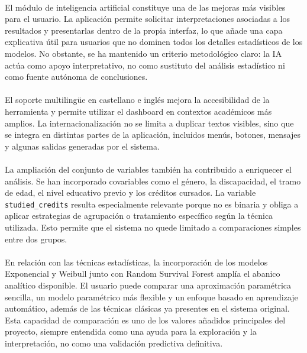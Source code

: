 \paragraph*{}El módulo de inteligencia artificial constituye una de las mejoras más visibles para el usuario. La aplicación permite solicitar interpretaciones asociadas a los resultados y presentarlas dentro de la propia interfaz, lo que añade una capa explicativa útil para usuarios que no dominen todos los detalles estadísticos de los modelos. No obstante, se ha mantenido un criterio metodológico claro: la IA actúa como apoyo interpretativo, no como sustituto del análisis estadístico ni como fuente autónoma de conclusiones.

\paragraph*{}El soporte multilingüe en castellano e inglés mejora la accesibilidad de la herramienta y permite utilizar el dashboard en contextos académicos más amplios. La internacionalización no se limita a duplicar textos visibles, sino que se integra en distintas partes de la aplicación, incluidos menús, botones, mensajes y algunas salidas generadas por el sistema.

\paragraph*{}La ampliación del conjunto de variables también ha contribuido a enriquecer el análisis. Se han incorporado covariables como el género, la discapacidad, el tramo de edad, el nivel educativo previo y los créditos cursados. La variable \texttt{studied\_credits} resulta especialmente relevante porque no es binaria y obliga a aplicar estrategias de agrupación o tratamiento específico según la técnica utilizada. Esto permite que el sistema no quede limitado a comparaciones simples entre dos grupos.

\paragraph*{}En relación con las técnicas estadísticas, la incorporación de los modelos Exponencial y Weibull junto con Random Survival Forest amplía el abanico analítico disponible. El usuario puede comparar una aproximación paramétrica sencilla, un modelo paramétrico más flexible y un enfoque basado en aprendizaje automático, además de las técnicas clásicas ya presentes en el sistema original. Esta capacidad de comparación es uno de los valores añadidos principales del proyecto, siempre entendida como una ayuda para la exploración y la interpretación, no como una validación predictiva definitiva.

